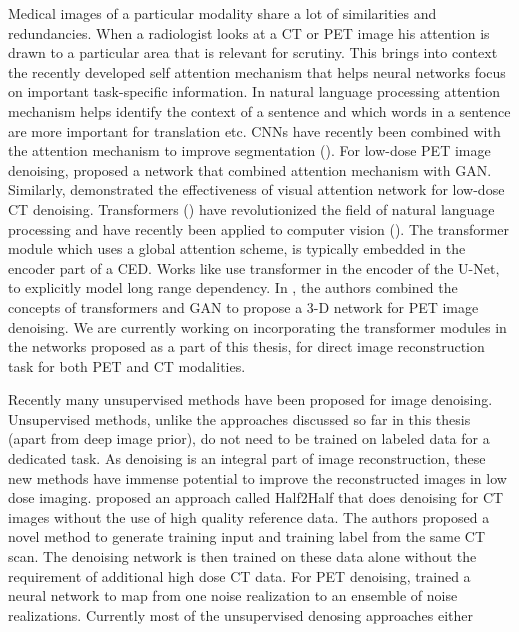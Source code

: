 Medical images of a particular modality share a lot of similarities and redundancies. When a radiologist looks at a \ac{CT} or \ac{PET} image his attention is drawn to a particular area that is relevant for scrutiny. This brings into context the recently developed self attention mechanism that helps neural networks focus on important task-specific information. In natural language processing attention mechanism helps identify the context of a sentence and which words in a sentence are more important for translation etc. \acp{CNN} have recently been combined with the attention mechanism to improve segmentation (\cite{li2020attention,hu2020parallel}). For low-dose \ac{PET} image denoising, \cite{xue20203d} proposed a network that combined attention mechanism with \ac{GAN}. Similarly, \cite{du2019visual} demonstrated the effectiveness of visual attention network for low-dose \ac{CT} denoising. Transformers (\cite{vaswani2017attention}) have revolutionized the field of natural language processing and have recently been applied to computer vision (\cite{khan2021transformers}). The transformer module which uses a global attention scheme, is typically embedded in the encoder part of a \ac{CED}. Works like \cite{chen2021transunet} use transformer in the encoder of the U-Net, to explicitly model long range dependency. In \cite{luo20213d}, the authors combined the concepts of transformers and \acs{GAN} to propose a 3-D network for \ac{PET} image denoising. We are currently working on incorporating the transformer modules in the networks proposed as a part of this thesis, for direct image reconstruction task for both \ac{PET} and \ac{CT} modalities.

Recently many unsupervised methods have been proposed for image denoising. Unsupervised methods, unlike the approaches discussed so far in this thesis (apart from deep image prior), do not need to be trained on labeled data for a dedicated task. As denoising is an integral part of image reconstruction, these new methods have immense potential to improve the reconstructed images in low dose imaging. \cite{yuan2020half2half} proposed an approach called Half2Half that does denoising for \ac{CT} images without the use of high quality reference data. The authors proposed a novel method to generate training input and training label from the same \ac{CT} scan. The denoising network is then trained on these data alone without the requirement of additional high dose \ac{CT} data. For \ac{PET} denoising, \cite{chan2019noise} trained a neural network to map from one noise realization to an ensemble of noise realizations. Currently most of the unsupervised denosing approaches either 


